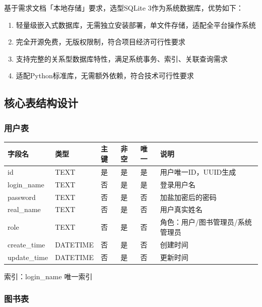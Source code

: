 \documentclass[12pt, a4paper]{article}
\begin{document}
基于需求文档「本地存储」要求，选型SQLite 3作为系统数据库，优势如下：
\begin{enumerate}
\item  轻量级嵌入式数据库，无需独立安装部署，单文件存储，适配全平台操作系统

\item  完全开源免费，无版权限制，符合项目经济可行性要求

\item  支持完整的关系型数据库特性，满足系统事务、索引、关联查询需求

\item  适配Python标准库，无需额外依赖，符合技术可行性要求
\end{enumerate}

\subsection{核心表结构设计}

\subsubsection{用户表}

\begin{table}[H]
    \centering
    \begin{tabular}{|l|l|l|l|l|l|}
        \hline
        字段名 & 类型 & 主键 & 非空 & 唯一 & 说明 \\
        \hline
        id & TEXT & 是 & 是 & 是 & 用户唯一ID，UUID生成 \\
        \hline
        login\_name & TEXT & 否 & 是 & 是 & 登录用户名 \\
        \hline
        password & TEXT & 否 & 是 & 否 & 加盐加密后的密码 \\
        \hline
        real\_name & TEXT & 否 & 是 & 否 & 用户真实姓名 \\
        \hline
        role & TEXT & 否 & 是 & 否 & 角色：用户/图书管理员/系统管理员\\
        \hline
        create\_time & DATETIME & 否 & 是 & 否 & 创建时间 \\
        \hline
        update\_time & DATETIME & 否 & 是 & 否 & 更新时间 \\
        \hline
    \end{tabular}
\end{table}
索引：login\_name  唯一索引

\subsubsection{图书表}
\end{document}
